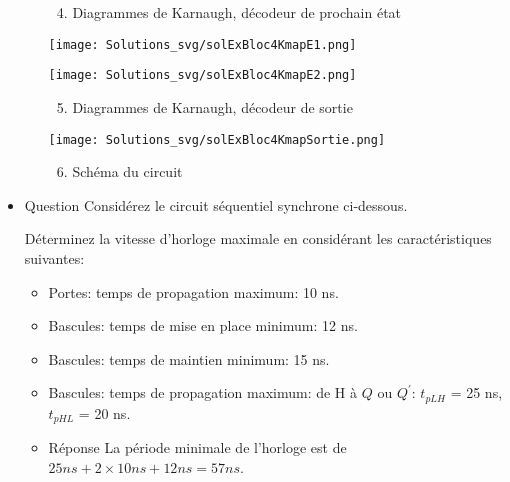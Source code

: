 \documentclass[letter, oneside]{book}
\begin{document}
\begin{itemize}
\begin{itemize}
\begin{enumerate}
\setcounter{enumi}{3}
\item Diagrammes de Karnaugh, décodeur de prochain
état
\end{enumerate}

\begin{center}
\texttt{[image: Solutions\_svg/solExBloc4KmapE1.png]}
\end{center}

\begin{center}
\texttt{[image: Solutions\_svg/solExBloc4KmapE2.png]}
\end{center}

\begin{enumerate}
\setcounter{enumi}{4}
\item Diagrammes de Karnaugh, décodeur de sortie
\end{enumerate}

\begin{center}
\texttt{[image: Solutions\_svg/solExBloc4KmapSortie.png]}
\end{center}

\begin{enumerate}
\setcounter{enumi}{5}
\item Schéma du circuit
\end{enumerate}

\begin{center}

\end{center}
\end{itemize}

\item Question
\label{sec:org73f714f}
Considérez le circuit séquentiel synchrone ci-dessous.

\begin{center}

\end{center}

Déterminez la vitesse d'horloge maximale en considérant les
caractéristiques suivantes:

\begin{itemize}
\item Portes: temps de propagation maximum: 10 ns.

\item Bascules: temps de mise en place minimum: 12 ns.

\item Bascules: temps de maintien minimum: 15 ns.

\item Bascules: temps de propagation maximum: de H à \(Q\) ou
\(Q^{\prime}\): \(t_{pLH}\) = 25 ns, \(t_{pHL}\) = 20 ns.
\end{itemize}

\begin{itemize}
\item Réponse
\label{sec:orgd32cb74}
La période minimale de l'horloge est de \(25ns + 2\times 10ns + 12ns = 57ns\).
\end{itemize}
\end{itemize}
\end{document}
